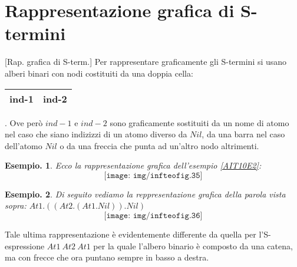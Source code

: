 \documentclass{book}
\newtheorem{esempio}{Esempio.}
\begin{document}
\section{Rappresentazione grafica di S-termini}[Rap. grafica di S-term.]
Per rappresentare graficamente gli S-termini si usano alberi binari con nodi
costituiti da una doppia cella: \begin{tabular}{|r|l|} \hline ind-1 & ind-2 \\ 
\hline \end{tabular}. Ove per\`o $ind-1$ e $ind-2$ sono graficamente sostituiti
da un nome di atomo nel caso che siano indizizzi di un atomo diverso da $Nil$,
da una barra nel caso dell'atomo $Nil$ o da una freccia che punta ad un'altro
nodo altrimenti.

\begin{esempio}Ecco la rappresentazione grafica dell'esempio \ref{AIT10E2}:
\[\texttt{[image: img/infteofig.35]}\]
\end{esempio}

\begin{esempio}Di seguito vediamo la reppresentazione grafica della parola 
vista sopra: $At1.((At2.(At1.Nil)).Nil)$
\[\texttt{[image: img/infteofig.36]}\]
\end{esempio}
Tale ultima rappresentazione \`e evidentemente differente da quella per
l'S-espres\-sione $At1\ At2\ At1$ per la quale l'albero binario \`e composto
da una catena, ma con frecce che ora puntano sempre in basso a destra.
\end{document}
